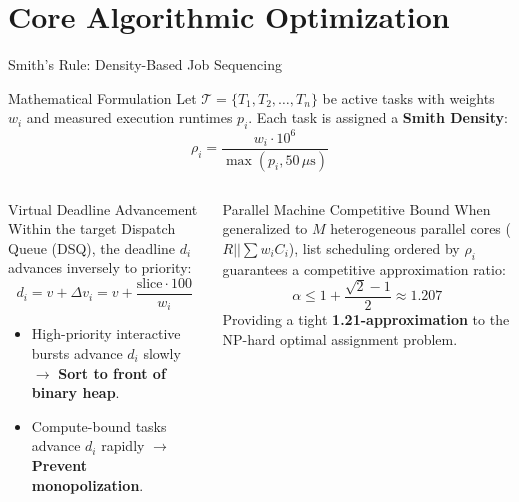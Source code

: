 \documentclass{beamer}
\begin{document}
\section{Core Algorithmic Optimization}

\begin{frame}{Smith's Rule: Density-Based Job Sequencing}
  \begin{block}{Mathematical Formulation}
    \footnotesize
    Let $\mathcal{T} = \{T_1, T_2, \dots, T_n\}$ be active tasks with weights $w_i$ and measured execution runtimes $p_i$.
    Each task is assigned a \textbf{Smith Density}:
    $$\rho_i = \frac{w_i \cdot 10^6}{\max(p_i, 50\,\mu\text{s})}$$
  \end{block}

  \begin{columns}[T]
      \begin{exampleblock}{Virtual Deadline Advancement}
        \scriptsize
        Within the target Dispatch Queue (DSQ), the deadline $d_i$ advances inversely to priority:
        $$d_i = v + \Delta v_i = v + \frac{\text{slice} \cdot 100}{w_i}$$
        \begin{itemize}\itemsep2pt\tiny
          \item High-priority interactive bursts advance $d_i$ slowly $\to$ \textbf{Sort to front of binary heap}.
          \item Compute-bound tasks advance $d_i$ rapidly $\to$ \textbf{Prevent monopolization}.
        \end{itemize}
      \end{exampleblock}

      \begin{alertblock}{Parallel Machine Competitive Bound}
        \scriptsize
        When generalized to $M$ heterogeneous parallel cores ($R || \sum w_i C_i$), list scheduling ordered by $\rho_i$ guarantees a competitive approximation ratio:
        $$\alpha \le 1 + \frac{\sqrt{2}-1}{2} \approx 1.207$$
        Providing a tight \textbf{1.21-approximation} to the NP-hard optimal assignment problem.
      \end{alertblock}
  \end{columns}
\end{frame}
\end{document}
